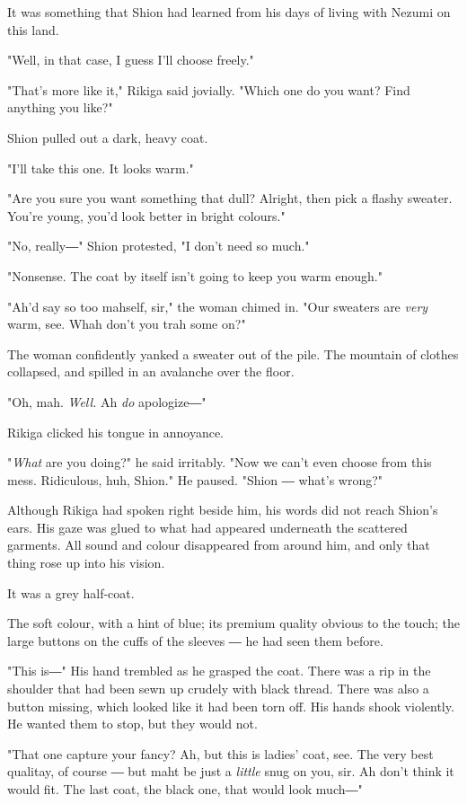 It was something that Shion had learned from his days of living with
Nezumi on this land.

"Well, in that case, I guess I'll choose freely."

"That's more like it," Rikiga said jovially. "Which one do you want?
Find anything you like?"

Shion pulled out a dark, heavy coat.

"I'll take this one. It looks warm."

"Are you sure you want something that dull? Alright, then pick a flashy
sweater. You're young, you'd look better in bright colours."

"No, really―" Shion protested, "I don't need so much."

"Nonsense. The coat by itself isn't going to keep you warm enough."

"Ah'd say so too mahself, sir," the woman chimed in. "Our sweaters are
\emph{very} warm, see. Whah don't you trah some on?"

The woman confidently yanked a sweater out of the pile. The mountain of
clothes collapsed, and spilled in an avalanche over the floor.

"Oh, mah. \emph{Well.} Ah \emph{do} apologize―"

Rikiga clicked his tongue in annoyance.

"\emph{What} are you doing?" he said irritably. "Now we can't even choose from
this mess. Ridiculous, huh, Shion." He paused. "Shion ― what's wrong?"

Although Rikiga had spoken right beside him, his words did not reach
Shion's ears. His gaze was glued to what had appeared underneath the
scattered garments. All sound and colour disappeared from around him,
and only that thing rose up into his vision.

It was a grey half-coat.

The soft colour, with a hint of blue; its premium quality obvious to the
touch; the large buttons on the cuffs of the sleeves ― he had seen them
before.

"This is―" His hand trembled as he grasped the coat. There was a rip in
the shoulder that had been sewn up crudely with black thread. There was
also a button missing, which looked like it had been torn off. His hands
shook violently. He wanted them to stop, but they would not.

"That one capture your fancy? Ah, but this is ladies' coat, see. The
very best qualitay, of course ― but maht be just a \emph{little} snug on you,
sir. Ah don't think it would fit. The last coat, the black one, that
would look much―"

